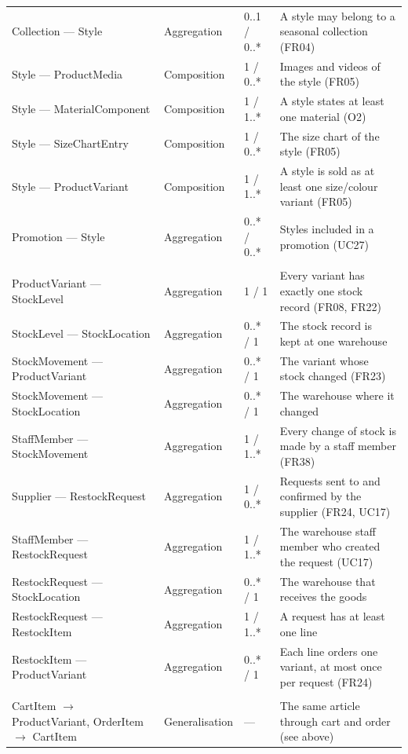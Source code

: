 {\begin{xltabular}{\textwidth}{@{}L{4.4cm} L{2.1cm} L{1.7cm} Y@{}}
Collection --- Style & Aggregation & 0..1 / 0..* & A style may belong to a seasonal collection (FR04) \\
Style --- ProductMedia & Composition & 1 / 0..* & Images and videos of the style (FR05) \\
Style --- MaterialComponent & Composition & 1 / 1..* & A style states at least one material (O2) \\
Style --- SizeChartEntry & Composition & 1 / 0..* & The size chart of the style (FR05) \\
Style --- ProductVariant & Composition & 1 / 1..* & A style is sold as at least one size/colour variant (FR05) \\
Promotion --- Style & Aggregation & 0..* / 0..* & Styles included in a promotion (UC27) \\ \addlinespace
{} \\
ProductVariant --- StockLevel & Aggregation & 1 / 1 & Every variant has exactly one stock record (FR08, FR22) \\
StockLevel --- StockLocation & Aggregation & 0..* / 1 & The stock record is kept at one warehouse \\
StockMovement --- ProductVariant & Aggregation & 0..* / 1 & The variant whose stock changed (FR23) \\
StockMovement --- StockLocation & Aggregation & 0..* / 1 & The warehouse where it changed \\
StaffMember --- StockMovement & Aggregation & 1 / 1..* & Every change of stock is made by a staff member (FR38) \\
Supplier --- RestockRequest & Aggregation & 1 / 0..* & Requests sent to and confirmed by the supplier (FR24, UC17) \\
StaffMember --- RestockRequest & Aggregation & 1 / 1..* & The warehouse staff member who created the request (UC17) \\
RestockRequest --- StockLocation & Aggregation & 0..* / 1 & The warehouse that receives the goods \\
RestockRequest --- RestockItem & Aggregation & 1 / 1..* & A request has at least one line \\
RestockItem --- ProductVariant & Aggregation & 0..* / 1 & Each line orders one variant, at most once per request (FR24) \\ \addlinespace
{} \\
CartItem $\rightarrow$ ProductVariant, OrderItem $\rightarrow$ CartItem & Generalisation & --- & The same article through cart and order (see above) \\

\end{xltabular}}
